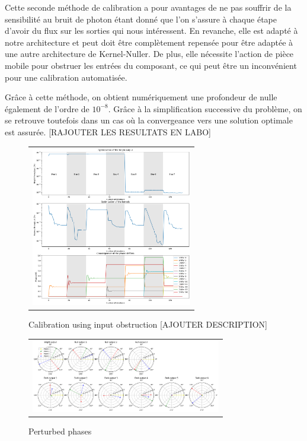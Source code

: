\documentclass{aa}
\begin{document}
            Cette seconde méthode de calibration a pour avantages de ne pas souffrir de la sensibilité au bruit de photon étant donné que l'on s'assure à chaque étape d'avoir du flux sur les sorties qui nous intéressent. En revanche, elle est adapté à notre architecture et peut doit être complètement repensée pour être adaptée à une autre architecture de Kernel-Nuller. De plus, elle nécessite l'action de pièce mobile pour obstruer les entrées du composant, ce qui peut être un inconvénient pour une calibration automatisée.

            Grâce à cette méthode, on obtient numériquement une profondeur de nulle également de l'ordre de $10^{-8}$. Grâce à la simplification successive du problème, on se retrouve toutefois dans un cas où la convergeance vers une solution optimale est assurée. [RAJOUTER LES RESULTATS EN LABO]

            \begin{figure}[H]
                \begin{center}
                \begin{tabular}{c}
                \includegraphics[height=7cm]{img/calibration_obstruction.png}
                \end{tabular}
                \end{center}
                \caption[calibration_obstruction] 
                { \label{fig:calibration_obstruction} 
                Calibration using input obstruction [AJOUTER DESCRIPTION]}
            \end{figure}

    \begin{figure}[H]
        \begin{center}
        \begin{tabular}{c}
        \includegraphics[height=3.2cm]{img/perturbed_phases.png}
        \end{tabular}
        \end{center}
        \caption[perturbed_phases] 
        { \label{fig:perturbed_phases} 
        Perturbed phases}
    \end{figure}
\end{document}
